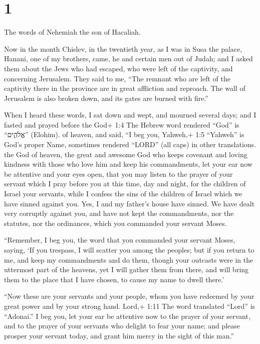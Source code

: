 \hypertarget{section}{%
\section{1}\label{section}}

 The words of Nehemiah the son of Hacaliah.

Now in the month Chislev, in the twentieth year, as I was in Susa the
palace,  Hanani, one of my brothers, came, he and certain
men out of Judah; and I asked them about the Jews who had escaped, who
were left of the captivity, and concerning Jerusalem.  They
said to me, ``The remnant who are left of the captivity there in the
province are in great affliction and reproach. The wall of Jerusalem is
also broken down, and its gates are burned with fire.''

 When I heard these words, I sat down and wept, and mourned
several days; and I fasted and prayed before the God+ 1:4 The Hebrew
word rendered ``God'' is ``אֱלֹהִ֑ים'' (Elohim). of heaven, 
and said, ``I beg you, Yahweh,+ 1:5 ``Yahweh'' is God's proper Name,
sometimes rendered ``LORD'' (all caps) in other translations. the God of
heaven, the great and awesome God who keeps covenant and loving kindness
with those who love him and keep his commandments,  let your
ear now be attentive and your eyes open, that you may listen to the
prayer of your servant which I pray before you at this time, day and
night, for the children of Israel your servants, while I confess the
sins of the children of Israel which we have sinned against you. Yes, I
and my father's house have sinned.  We have dealt very
corruptly against you, and have not kept the commandments, nor the
statutes, nor the ordinances, which you commanded your servant Moses.

 ``Remember, I beg you, the word that you commanded your
servant Moses, saying, `If you trespass, I will scatter you among the
peoples;  but if you return to me, and keep my commandments
and do them, though your outcasts were in the uttermost part of the
heavens, yet I will gather them from there, and will bring them to the
place that I have chosen, to cause my name to dwell there.'

 ``Now these are your servants and your people, whom you
have redeemed by your great power and by your strong hand. 
Lord,+ 1:11 The word translated ``Lord'' is ``Adonai.'' I beg you, let
your ear be attentive now to the prayer of your servant, and to the
prayer of your servants who delight to fear your name; and please
prosper your servant today, and grant him mercy in the sight of this
man.''

